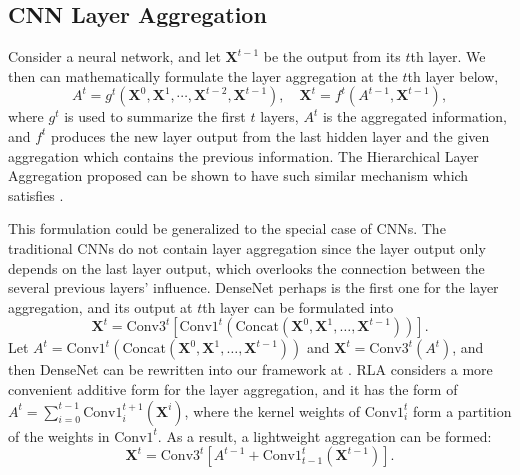 

\subsection{CNN Layer Aggregation}
\label{5.1}
Consider a neural network, and let $\boldsymbol{X}^{t-1}$ be the output from its $t$th layer. We then can mathematically formulate the layer aggregation at the $t$th layer below,
\begin{equation}
\label{eq:CNN_agg}
    A^t =g^t(\boldsymbol{X}^{0},\boldsymbol{X}^{1},\cdots,\boldsymbol{X}^{t-2},\boldsymbol{X}^{t-1}), \quad
    \boldsymbol{X}^t = f^t(A^{t-1},\boldsymbol{X}^{t-1}), 
\end{equation}
where $g^t$ is used to summarize the first $t$ layers, $A^t$ is the aggregated information, and $f^t$ produces the new layer output from the last hidden layer and the given aggregation which contains the previous information. 
The Hierarchical Layer Aggregation proposed \citep{yu2018deep} can be shown to have such similar mechanism which satisfies  .

This formulation could be generalized to the special case of CNNs.
The traditional CNNs do not contain layer aggregation since the layer output only depends on the last layer output, which overlooks the connection between the several previous layers' influence.
DenseNet \citep{huang2018denselyconnectedconvolutionalnetworks} perhaps is the first one for the layer aggregation, and its output at $t$th layer can be formulated into
\begin{equation}
\label{eq:densenet}
\boldsymbol{X}^t=\text{Conv3}^t[\text{Conv1}^t(\text{Concat}(\boldsymbol{X}^0, \boldsymbol{X}^1, \ldots, \boldsymbol{X}^{t-1}))].
\end{equation}
Let $A^t = \text{Conv1}^t(\text{Concat}(\boldsymbol{X}^0, \boldsymbol{X}^1, \ldots, \boldsymbol{X}^{t-1}))$ and $\boldsymbol{X}^t = \text{Conv3}^t (A^t)$, and then DenseNet can be rewritten into our framework at .
RLA \citep{zhao2021recurrence} considers a more convenient additive form for the layer aggregation, and it has the form of $A^t = \sum _{i=0}^{t-1} \text{Conv1}^{t+1}_i(\boldsymbol{X}^i)$, where the kernel weights of $\text{Conv1}^t_i$ form a partition of the weights in $\text{Conv1}^t$.
As a result, a lightweight aggregation can be formed:
\begin{equation}
\label{eq:densenet_re}
    \boldsymbol{X}^t=\text{Conv3}^t [ A^{t-1} + \text{Conv1}^{t}_{t-1}(\boldsymbol{X}^{t-1}) ].
\end{equation}

